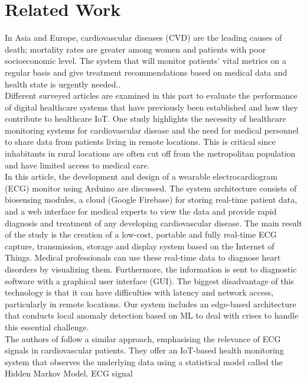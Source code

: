 \documentclass{bmcart}
\begin{document}
\section*{Related Work}
In Asia and Europe, cardiovascular diseases (CVD) are the leading causes of
death; mortality rates are greater among women and patients with poor
socioeconomic level. The system that will monitor patients' vital metrics on a
regular basis and give treatment recommendations based on medical data and
health state is urgently needed.\cite{app12010519}.\\
Different surveyed articles are examined in this part to evaluate the
performance of digital healthcare systems that have previously been established
and how they contribute to healthcare IoT. One study \cite{Varshney2019IoTBE}
highlights the necessity of healthcare monitoring systems for cardiovascular
disease and the need for medical personnel to share data from patients living in
remote locations. This is critical since inhabitants in rural locations are
often cut off from the metropolitan population and have limited access to
medical care.\\
In this article, the development and design of a wearable electrocardiogram (ECG) monitor using
Arduino are discussed. The system architecture consists of
biosensing modules, a cloud (Google Firebase) for storing real-time patient
data, and a web interface for medical experts to view the data and provide rapid
diagnosis and treatment of any developing cardiovascular disease. The 
main result of the study is the creation of a low-cost, portable and fully real-time ECG
capture, transmission, storage and display system based on the Internet of
Things. Medical professionals can use these real-time data to diagnose heart
disorders by visualizing them. Furthermore, the information is sent to
diagnostic software with a graphical user interface (GUI). The biggest
disadvantage of this technology is that it can have difficulties with latency
and network access, particularly in remote locations. Our system includes an
edge-based architecture that conducts local anomaly detection based on ML to
deal with crises to handle this essential challenge.\\
The authors of \cite{0a1fa6938fc34df1a7b0b24631b3a22c} follow a similar
approach, emphasising the relevance of ECG signals in cardiovascular patients.
They offer an IoT-based health monitoring system that observes the underlying
data using a statistical model called the Hidden Markov Model. ECG signal
\end{document}
